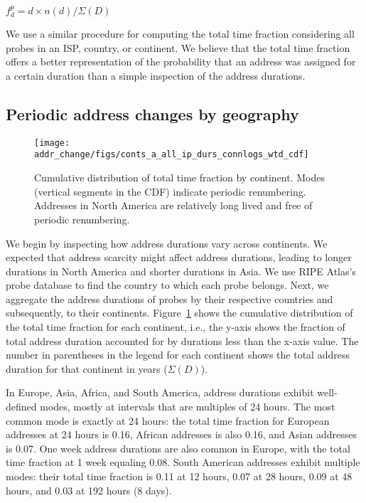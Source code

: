 $f^p_d =  d \times n(d) / \Sigma(D)$

We use a similar procedure for computing the total time fraction
considering all probes in an ISP, country, or continent. We believe that  
the total time fraction offers a better representation of 
the probability that an address was assigned for a certain
duration than a simple inspection of the address durations. 

\subsection{Periodic address changes by geography}
\label{sec:periodic-geography}

\begin{figure}[tb]
  \begin{center}
    \texttt{[image: addr\_change/figs/conts\_a\_all\_ip\_durs\_connlogs\_wtd\_cdf]}
  \end{center}
  \caption[Cumulative distribution of total time fraction by continent]{\label{fig:conts_all_durs} 
    Cumulative distribution of total time fraction by continent. 
    Modes (vertical segments
    in the CDF) indicate periodic renumbering.  Addresses in North America
    are relatively long lived and free of periodic renumbering.}
\end{figure}

We begin by inspecting how address durations vary across continents.
We expected that address scarcity might affect address durations,
leading to longer durations in North America and shorter durations in
Asia.  We use RIPE Atlas's probe database to find the country to which
each probe belongs. Next, we aggregate the address durations of probes
by their respective countries and subsequently, to their continents.
Figure~\ref{fig:conts_all_durs} shows the cumulative distribution of
the total time fraction for each continent, i.e., the y-axis shows the
fraction of total address duration accounted for by durations less
than the x-axis value.
The number in
parentheses in the legend for each continent shows the total
 address duration for that continent in years ($\Sigma(D)$).

In Europe, Asia, Africa, and South America, address durations exhibit
well-defined modes, mostly at intervals that are multiples of 24
hours. The most common mode is exactly at 24 hours: the total time
fraction for European addresses at 24 hours is 0.16, African addresses
is also 0.16, and Asian addresses is 0.07.  One week address durations
are also common in Europe, with the total time fraction at 1 week
equaling 0.08.  South American addresses exhibit multiple modes: their
total time fraction is 0.11 at 12 hours, 0.07 at 28 hours, 0.09 at 48
hours, and 0.03 at 192 hours (8 days).

